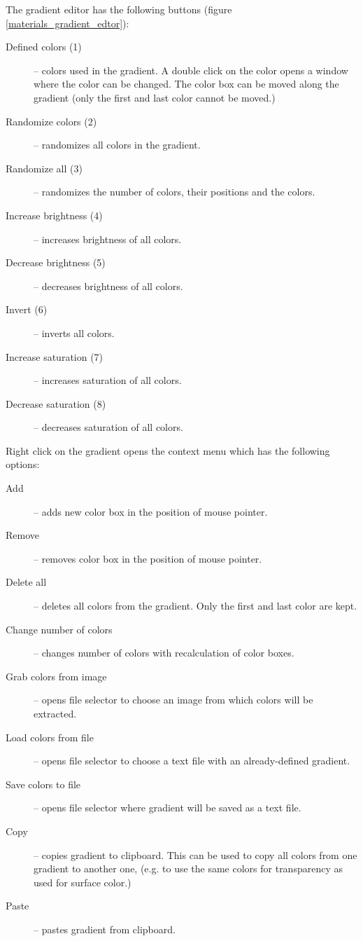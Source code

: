 The gradient editor has the following buttons (figure \ref{materials_gradient_edtor}):
\nopagebreak
\begin{description}
	\item[Defined colors (1)] -- colors used in the gradient. A double click on the color opens a window where the color can be changed. The color box can be moved along the gradient (only the first and last color cannot be moved.)
	\item[Randomize colors (2)] -- randomizes all colors in the gradient.
	\item[Randomize all (3)] -- randomizes the number of colors, their positions and the colors.
	\item[Increase brightness (4)] -- increases brightness of all colors.
	\item[Decrease brightness (5)] -- decreases brightness of all colors.
	\item[Invert (6)] -- inverts all colors.
	\item[Increase saturation (7)] -- increases saturation of all colors.
	\item[Decrease saturation (8)] -- decreases saturation of all colors.
\end{description}

Right click on the gradient opens the context menu which has the following options:
\nopagebreak
\begin{description}
	\item[Add] -- adds new color box in the position of mouse pointer.
	\item[Remove] -- removes color box in the position of mouse pointer.
	\item[Delete all] -- deletes all colors from the gradient. Only the first and last color are kept.
	\item[Change number of colors] -- changes number of colors with recalculation of color boxes.
	\item[Grab colors from image] -- opens file selector to choose an image from which colors will be extracted.
	\item[Load colors from file] -- opens file selector to choose a text file with an already-defined gradient.
	\item[Save colors to file] -- opens file selector where gradient will be saved as a text file.
	\item[Copy] -- copies gradient to clipboard. This can be used to copy all colors from one gradient to another one, (e.g. to use the same colors for transparency as used for surface color.)
	\item[Paste] -- pastes gradient from clipboard. 
\end{description}

